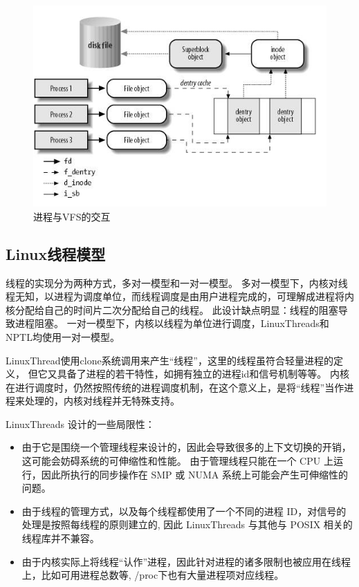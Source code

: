 \begin{figure}[ht]
	\begin{center}
		\includegraphics[keepaspectratio,width=0.4\paperwidth]{Pictures/Kernel/LinuxProcessAndVFS.png}
	\caption{进程与VFS的交互}
	\label{fig:LinuxProcessAndVFS}
	\end{center}
\end{figure}

\subsection{Linux线程模型}

线程的实现分为两种方式，多对一模型和一对一模型。
多对一模型下，内核对线程无知，以进程为调度单位，而线程调度是由用户进程完成的，可理解成进程将内核分配给自己的时间片二次分配给自己的线程。
此设计缺点明显：线程的阻塞导致进程阻塞。
一对一模型下，内核以线程为单位进行调度，LinuxThreads和NPTL均使用一对一模型。

LinuxThread使用clone系统调用来产生“线程”，这里的线程虽符合轻量进程的定义， 但它又具备了进程的若干特性，如拥有独立的进程id和信号机制等等。
内核在进行调度时，仍然按照传统的进程调度机制，在这个意义上，是将“线程”当作进程来处理的，内核对线程并无特殊支持。

 LinuxThreads 设计的一些局限性：
 \begin{itemize}
 \item 由于它是围绕一个管理线程来设计的，因此会导致很多的上下文切换的开销，这可能会妨碍系统的可伸缩性和性能。
 由于管理线程只能在一个 CPU 上运行，因此所执行的同步操作在 SMP 或 NUMA 系统上可能会产生可伸缩性的问题。
 \item 由于线程的管理方式，以及每个线程都使用了一个不同的进程 ID，对信号的处理是按照每线程的原则建立的, 因此 LinuxThreads 与其他与 POSIX 相关的线程库并不兼容。
 \item 由于内核实际上将线程“认作”进程，因此针对进程的诸多限制也被应用在线程上，比如可用进程总数等, /proc下也有大量进程项对应线程。
 \end{itemize}

